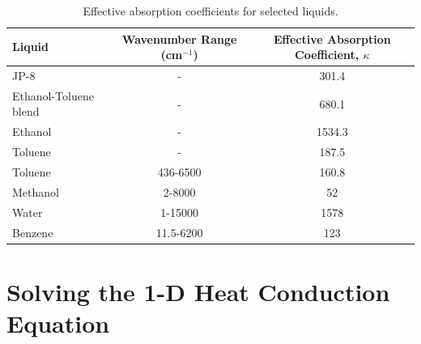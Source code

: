\begin{table}[ht]
\caption[Effective absorption coefficients for selected liquids]{Effective absorption coefficients for selected liquids.}
\centering
\begin{tabular}{l c c}
\hline\hline
Liquid                                              & Wavenumber Range (cm$^{-1}$)  & Effective Absorption Coefficient, $\kappa$    \\ \hline
JP-8 \cite{Suo-Anttila:PCT2009}                     &  -                            & 301.4                                         \\
Ethanol-Toluene blend \cite{Suo-Anttila:PCT2009}    &  -                            & 680.1                                         \\
Ethanol \cite{Suo-Anttila:PCT2009}                  &  -                            & 1534.3                                        \\
Toluene \cite{Suo-Anttila:PCT2009}                  &  -                            & 187.5                                         \\
Toluene \cite{Bertie:AS1994a}                       &  436-6500                     & 160.8                                         \\
Methanol\cite{Bertie:AS1993a}                       &  2-8000                       & 52                                            \\
Water   \cite{Bertie:AS1996}                        &  1-15000                      & 1578                                          \\
Benzene \cite{Bertie:AS1993b}                       &  11.5-6200                    & 123                                           \\ \hline
\end{tabular}
\label{tbl_abscoeff}
\end{table}




\chapter{Solving the 1-D Heat Conduction Equation}
\label{discretization}


